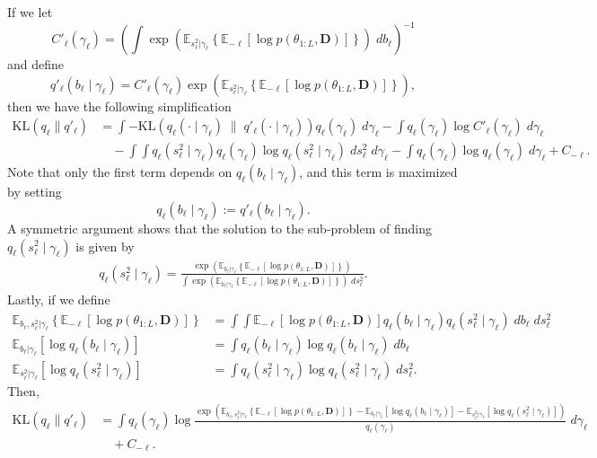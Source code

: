 \documentclass{article}
\newcommand{\E}{\mathbb{E}}
\begin{document}
If we let $$C'_{\ell}(\gamma_\ell) = \left(\int \exp\left(\E_{s^2_\ell|\gamma_\ell}\left\{\E_{-\ell}\left[\log p(\theta_{1:L}, \mathbf{D})\right]\right\}\right)\;db_\ell\right)^{-1}$$ and define $$q'_\ell(b_\ell \;|\; \gamma_\ell) = C'_{\ell}(\gamma_\ell)\exp\left(\E_{s^2_\ell|\gamma_\ell}\left\{\E_{-\ell}\left[\log p(\theta_{1:L}, \mathbf{D})\right]\right\}\right),$$ then we have the following simplification 
\begin{align*}
    \text{KL}(q_\ell \lVert q'_\ell) &= 
    \int -\text{KL}(q_\ell(\cdot \;|\; \gamma_\ell)\;\lVert\; q'_\ell(\cdot \;|\; \gamma_\ell))q_\ell(\gamma_\ell)\;d\gamma_\ell- \int q_\ell(\gamma_\ell) \log C'_{\ell}(\gamma_\ell) \;d\gamma_\ell \\
    &\quad - \int\int q_\ell(s^2_\ell\;|\;\gamma_\ell)q_\ell(\gamma_\ell)\log q_\ell(s^2_\ell\;|\;\gamma_\ell)\;ds^2_\ell\;d\gamma_\ell - \int q_\ell(\gamma_\ell)\log q_\ell(\gamma_\ell)\;d\gamma_\ell + C_{-\ell}.
\end{align*}
Note that only the first term depends on $q_\ell(b_\ell\;|\;\gamma_\ell)$, and this term is maximized by setting $$q_\ell(b_\ell\;|\;\gamma_\ell) := q'_\ell(b_\ell\;|\;\gamma_\ell).$$ A symmetric argument shows that the solution to the sub-problem of finding $q_\ell(s^2_\ell\;|\;\gamma_\ell)$ is given by 
\begin{align*}
    q_\ell(s^2_\ell\;|\;\gamma_\ell) = \frac{\exp\left(\E_{b_\ell|\gamma_\ell}\left\{\E_{-\ell}\left[\log p(\theta_{1:L}, \mathbf{D})\right]\right\}\right)}{\int \exp\left(\E_{b_\ell|\gamma_\ell}\left\{\E_{-\ell}\left[\log p(\theta_{1:L}, \mathbf{D})\right]\right\}\right)\;ds^2_\ell}.
\end{align*}
Lastly, if we define 
\begin{align*}
    \E_{b_\ell,s^2_\ell|\gamma_\ell}\left\{\E_{-\ell}\left[\log p(\theta_{1:L}, \mathbf{D})\right]\right\} &= \int\int \E_{-\ell}\left[\log p(\theta_{1:L}, \mathbf{D})\right] q_\ell(b_\ell\;|\;\gamma_\ell) q_\ell(s^2_\ell\;|\;\gamma_\ell) \; db_\ell\; ds^2_\ell \\
    \E_{b_\ell|\gamma_\ell}[\log q_\ell(b_\ell\;|\;\gamma_\ell)] &= \int q_\ell(b_\ell\;|\;\gamma_\ell)\log q_\ell(b_\ell\;|\;\gamma_\ell) \; db_\ell \\
    \E_{s^2_\ell|\gamma_\ell}[\log q_\ell(s^2_\ell\;|\;\gamma_\ell)] &= \int q_\ell(s^2_\ell\;|\;\gamma_\ell)\log q_\ell(s^2_\ell\;|\;\gamma_\ell) \; ds^2_\ell.
\end{align*}
Then,
\small
\begin{align*}
    \text{KL}(q_\ell \lVert q'_\ell) &= 
    \int q_\ell(\gamma_\ell)\log \frac{\exp\left(\E_{b_\ell,s^2_\ell|\gamma_\ell}\left\{\E_{-\ell}\left[\log p(\theta_{1:L}, \mathbf{D})\right]\right\}- \E_{b_\ell|\gamma_\ell}[\log q_\ell(b_\ell\;|\;\gamma_\ell)]- \E_{s^2_\ell|\gamma_\ell}[\log q_\ell(s^2_\ell\;|\;\gamma_\ell)]\right)}{q_\ell(\gamma_\ell)} \;d\gamma_\ell \\
    &\quad + C_{-\ell}.
\end{align*}
\end{document}
